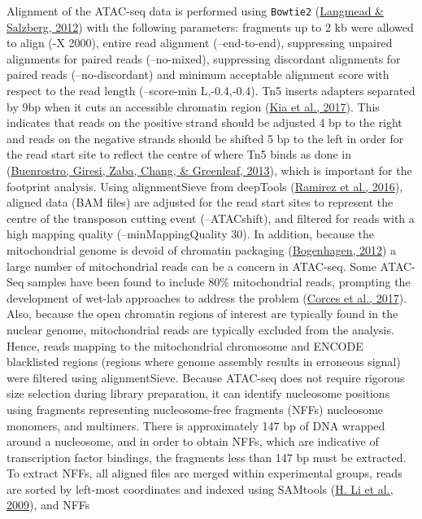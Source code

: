 \documentclass[12pt,twoside]{reedthesis}
\begin{document}
Alignment of the ATAC-seq data is performed using \texttt{Bowtie2}
(\protect\hyperlink{ref-langmead2012}{Langmead \& Salzberg, 2012}) with the following parameters: fragments up to 2 kb were
allowed to align (-X 2000), entire read alignment (--end-to-end),
suppressing unpaired alignments for paired reads (--no-mixed),
suppressing discordant alignments for paired reads (--no-discordant) and
minimum acceptable alignment score with respect to the read length
(--score-min L,-0.4,-0.4). Tn5 inserts adapters separated by 9bp when it
cuts an accessible chromatin region (\protect\hyperlink{ref-kia2017}{Kia et al., 2017}). This indicates that
reads on the positive strand should be adjusted 4 bp to the right and
reads on the negative strands should be shifted 5 bp to the left in
order for the read start site to reflect the centre of where Tn5 binds
as done in (\protect\hyperlink{ref-buenrostro2013}{Buenrostro, Giresi, Zaba, Chang, \& Greenleaf, 2013}), which is important for the footprint
analysis. Using alignmentSieve from deepTools (\protect\hyperlink{ref-ramirez2016}{Ramirez et al., 2016}), aligned
data (BAM files) are adjusted for the read start sites to represent the
centre of the transposon cutting event (--ATACshift), and filtered for
reads with a high mapping quality (--minMappingQuality 30). In addition,
because the mitochondrial genome is devoid of chromatin packaging
(\protect\hyperlink{ref-bogenhagen2012}{Bogenhagen, 2012}) a large number of mitochondrial reads can be a concern
in ATAC-seq. Some ATAC-Seq samples have been found to include 80\%
mitochondrial reads, prompting the development of wet-lab approaches to
address the problem (\protect\hyperlink{ref-corces2017}{Corces et al., 2017}). Also, because the open chromatin
regions of interest are typically found in the nuclear genome,
mitochondrial reads are typically excluded from the analysis. Hence,
reads mapping to the mitochondrial chromosome and ENCODE blacklisted
regions (regions where genome assembly results in erroneous signal) were
filtered using alignmentSieve. Because ATAC-seq does not require
rigorous size selection during library preparation, it can identify
nucleosome positions using fragments representing nucleosome-free
fragments (NFFs) nucleosome monomers, and multimers. There is
approximately 147 bp of DNA wrapped around a nucleosome, and in order to
obtain NFFs, which are indicative of transcription factor bindings, the
fragments less than 147 bp must be extracted. To extract NFFs, all
aligned files are merged within experimental groups, reads are sorted by
left-most coordinates and indexed using SAMtools (\protect\hyperlink{ref-li2009}{H. Li et al., 2009}), and NFFs
\end{document}
